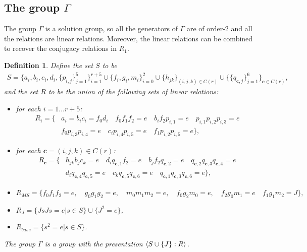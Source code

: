 \documentclass[11pt,letterpaper]{article}
\DeclarePairedDelimiter{\ip}{\langle}{\rangle}
\newcommand{\1}{\mathbb{1}}
\newcommand{\bc}{\pmb{c}}
\newtheorem{definition}[theorem]{Definition}
\theoremstyle{definition}
\begin{document}
\subsection{The group $\Gamma$}
\label{sec:gamma}
The group $\Gamma$ is a solution group,
so all the generators of $\Gamma$ are of order-$2$
and all the relations are linear relations.
Moreover, the linear relations can be combined
to recover the conjugacy relations in $R_1$.
\begin{definition}
\label{def:gamma}
Define the set $S$ to be 
\begin{align*}
	S = \{a_i, b_i, c_i, d_i,\{ p_{i,j} \}_{j=1}^5\}_{i=1}^{r+5} \cup \{f_i,g_i,m_i\}_{i=0}^2 \cup \{h_{jk}\}_{(i,j,k) \in C(r)} \cup 
	\{\{q_{\bc,j} \}_{j=1}^6\}_{\bc \in C(r)},
\end{align*}
and the set $R$ to be the union of the following
sets of linear relations:
\begin{itemize}
\item for each $i = 1 \dots r+5$:
\begin{align*}
	R_i =  \{ &a_i = b_ic_i = f_0d_i\quad
	f_0 f_1 f_2 = e \quad b_i f_2 p_{i,1} = e \quad p_{i,1} p_{i,2} p_{i,3} = e\\
	&f_0 p_{i,3} p_{i,4} = e \quad c_i p_{i,4} p_{i,5} =e \quad f_1 p_{i,2} p_{i,5} = e\},
\end{align*}
\item for each $ \bc = (i,j,k) \in C(r)$:
\begin{align*}
	R_{\bc} = \{&h_{jk}b_j c_k = e \quad
	d_i q_{\bc,1} f_2 = e \quad b_j f_2 q_{\bc,2} = e \quad q_{\bc,2} q_{\bc,3} q_{\bc,4} = e\\
	&d_i q_{\bc,4} q_{\bc,5} = e \quad c_k q_{\bc,5} q_{\bc,6} =e \quad q_{\bc,1} q_{\bc,3} q_{\bc,6} = e\},
\end{align*}
\item 
$
	R_{MS} = \{f_0 f_1 f_2 = e,\quad g_0 g_1 g_2 = e,\quad m_0 m_1 m_2 = e,\quad
	f_0 g_2 m_0 = e, \quad f_2 g_0 m_1 = e \quad f_1 g_1 m_2 = J\},
$
\item $R_J = \{ J s J s = e \vert s \in S\} \cup \{J^2 = e\}$,
\item $R_{base} = \{ s^2 = e \vert s \in S\}$.
\end{itemize}
The group $\Gamma$ is a group with the presentation
$\ip{S \cup \{J\} : R}$.
\end{definition}
\end{document}
